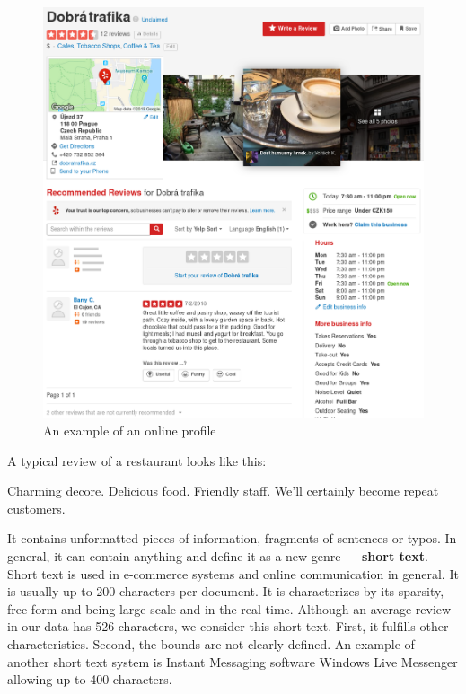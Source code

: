 \begin{figure}[ht]\centering
\includegraphics[width=130mm]{../img/dobra_trafika.png}
\caption{An example of an online profile}
\label{fig:dobra_trafika}
\end{figure}

A typical review of a restaurant looks like this:

\begin{code}
Charming decore. Delicious food. Friendly staff.
We'll certainly become repeat customers.
\end{code}

It contains unformatted pieces of information, fragments of sentences or typos.
In general, it can contain anything and \citet{Song14} define it as a new genre --- \textbf{short text}.
Short text is used in e-commerce systems and online communication in general.
It is usually up to 200 characters per document.
It is characterizes by its sparsity, free form and being large-scale and in the real time.
Although an average review in our data has 526 characters, we consider this short text.
First, it fulfills other characteristics.
Second, the bounds are not clearly defined.
An example of another short text system is Instant Messaging software Windows Live Messenger allowing up to 400 characters.


